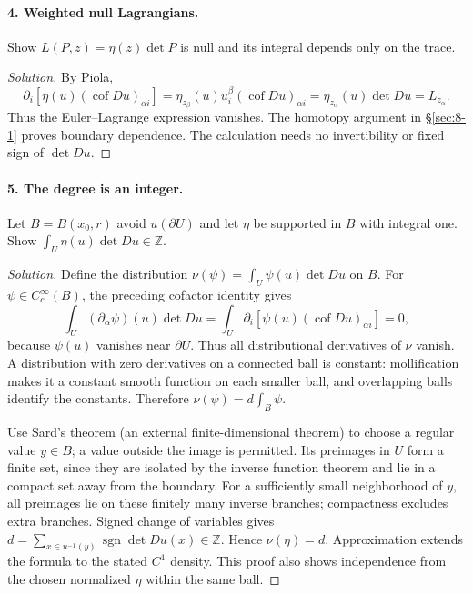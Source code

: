 \Needspace{30mm}
\paragraph{4. Weighted null Lagrangians.}
Show $L(P,z)=\eta(z)\det P$ is null and its integral depends only on the trace.
\begin{proof}[Solution]
By Piola,
\[
 \partial_i[\eta(u)(\operatorname{cof}Du)_{\alpha i}]
 =\eta_{z_\beta}(u)u_i^\beta(\operatorname{cof}Du)_{\alpha i}
 =\eta_{z_\alpha}(u)\det Du=L_{z_\alpha}.
\]
Thus the Euler--Lagrange expression vanishes. The homotopy argument in
\S\ref{sec:8-1} proves boundary dependence. The calculation needs no
invertibility or fixed sign of $\det Du$.
\end{proof}

\Needspace{30mm}
\paragraph{5. The degree is an integer.}
Let $B=B(x_0,r)$ avoid $u(\partial U)$ and let $\eta$ be supported in $B$
with integral one. Show $\int_U\eta(u)\det Du\in\mathbb Z$.
\begin{proof}[Solution]
Define the distribution $\nu(\psi)=\int_U\psi(u)\det Du$ on $B$.
For $\psi\in C_c^\infty(B)$, the preceding cofactor identity gives
\[
 \int_U(\partial_\alpha\psi)(u)\det Du
 =\int_U\partial_i[\psi(u)(\operatorname{cof}Du)_{\alpha i}]=0,
\]
because $\psi(u)$ vanishes near $\partial U$.
Thus all distributional derivatives of $\nu$ vanish. A distribution with
zero derivatives on a connected ball is constant: mollification makes it
a constant smooth function on each smaller ball, and overlapping balls
identify the constants. Therefore $\nu(\psi)=d\int_B\psi$.

Use Sard's theorem (an external finite-dimensional theorem) to choose a
regular value $y\in B$; a value outside the image is permitted.
Its preimages in $U$ form a finite set, since they are isolated by the
inverse function theorem and lie in a compact set away from the boundary.
For a sufficiently small neighborhood of $y$, all preimages lie on these
finitely many inverse branches; compactness excludes extra branches.
Signed change of variables gives
$d=\sum_{x\in u^{-1}(y)}\operatorname{sgn}\det Du(x)\in\mathbb Z$.
Hence $\nu(\eta)=d$. Approximation extends the formula to the stated
$C^1$ density. This proof also shows independence from the chosen normalized
$\eta$ within the same ball.
\end{proof}
\Needspace{55mm}

